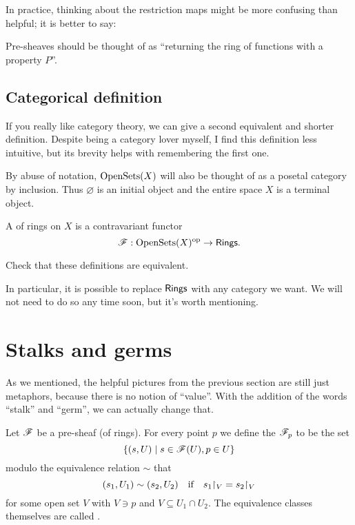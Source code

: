 In practice, thinking about the restriction maps
might be more confusing than helpful; it is better to say:
\begin{moral}
	Pre-sheaves should be thought of as
	``returning the ring of functions with a property $P$''.
\end{moral}

\subsection{Categorical definition}
If you really like category theory,
we can give a second equivalent and shorter definition.
Despite being a category lover myself,
I find this definition less intuitive,
but its brevity helps with remembering the first one.
\begin{abuse}
	By abuse of notation, $\operatorname{OpenSets}(X)$ will also be thought of as a
	posetal category by inclusion. Thus $\varnothing$ is an initial object
	and the entire space $X$ is a terminal object.
\end{abuse}
\begin{definition}
	A  of rings on $X$ is a contravariant functor
	\[ \mathscr F : \operatorname{OpenSets}(X)^{\mathrm{op}} \to \mathsf{Rings}. \]
\end{definition}
\begin{exercise}
	Check that these definitions are equivalent.
\end{exercise}
In particular, it is possible to replace $\mathsf{Rings}$ with any category we want.
We will not need to do so any time soon, but it's worth mentioning.


\section{Stalks and germs}

As we mentioned, the helpful pictures from the previous section
are still just metaphors, because there is no notion of ``value''.
With the addition of the words ``stalk'' and ``germ'',
we can actually change that.

\begin{definition}
	Let $\mathscr F$ be a pre-sheaf (of rings).
	For every point $p$ we define the  $\mathscr F_p$ to be the set
	\[ \left\{ (s, U) \mid s \in \mathscr F(U), p \in U \right\} \]
	modulo the equivalence relation $\sim$ that
	\[ (s_1,U_1) \sim (s_2, U_2)
		\quad\text{if}\quad
		s_1 \restrict{V} = s_2 \restrict{V} \]
	for some open set $V$ with $V \ni p$
	and $V \subseteq U_1 \cap U_2$.
	The equivalence classes themselves are called .
\end{definition}

